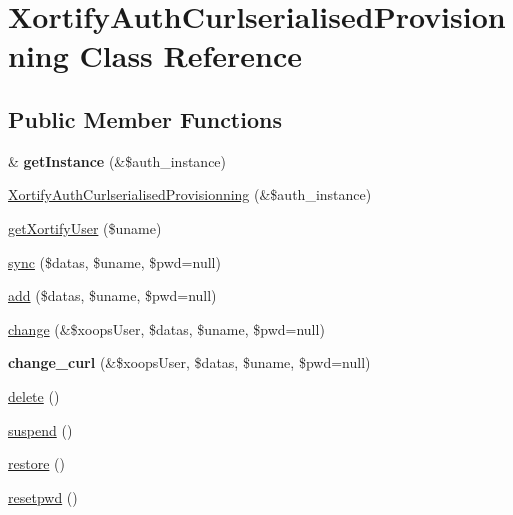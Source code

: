 \hypertarget{class_xortify_auth_curlserialised_provisionning}{\section{Xortify\-Auth\-Curlserialised\-Provisionning Class Reference}
\label{class_xortify_auth_curlserialised_provisionning}
}
\subsection*{Public Member Functions}
\begin{DoxyCompactItemize}
\item 
\hypertarget{class_xortify_auth_curlserialised_provisionning_a2c8eaa915c70d75289ac8a03686194f9}{\& {\bfseries get\-Instance} (\&\$auth\-\_\-instance)}\label{class_xortify_auth_curlserialised_provisionning_a2c8eaa915c70d75289ac8a03686194f9}

\item 
\hyperlink{class_xortify_auth_curlserialised_provisionning_aaae1c1a1306d79a38af6f3e08f39b626}{Xortify\-Auth\-Curlserialised\-Provisionning} (\&\$auth\-\_\-instance)
\item 
\hyperlink{class_xortify_auth_curlserialised_provisionning_a041d726ac26672547ed1504e8e0117aa}{get\-Xortify\-User} (\$uname)
\item 
\hyperlink{class_xortify_auth_curlserialised_provisionning_a35dc08b0f2138eb818ff95345b73bcff}{sync} (\$datas, \$uname, \$pwd=null)
\item 
\hyperlink{class_xortify_auth_curlserialised_provisionning_adfc9fcef01e7bd7b2f47e8e79d51fc63}{add} (\$datas, \$uname, \$pwd=null)
\item 
\hyperlink{class_xortify_auth_curlserialised_provisionning_ae1f0971b9712c794620cf309164e43af}{change} (\&\$xoops\-User, \$datas, \$uname, \$pwd=null)
\item 
\hypertarget{class_xortify_auth_curlserialised_provisionning_aba6f598c234d191a3b3934f90b35fd9f}{{\bfseries change\-\_\-curl} (\&\$xoops\-User, \$datas, \$uname, \$pwd=null)}\label{class_xortify_auth_curlserialised_provisionning_aba6f598c234d191a3b3934f90b35fd9f}

\item 
\hyperlink{class_xortify_auth_curlserialised_provisionning_a13bdffdd926f26b825ea57066334ff01}{delete} ()
\item 
\hyperlink{class_xortify_auth_curlserialised_provisionning_ad73006a505121228f3b075c2409787d2}{suspend} ()
\item 
\hyperlink{class_xortify_auth_curlserialised_provisionning_aa1371f22826cf8cde4454c9b467203d0}{restore} ()
\item 
\hyperlink{class_xortify_auth_curlserialised_provisionning_a06d70fbd3a2db390b6f2530c0076628e}{resetpwd} ()
\end{DoxyCompactItemize}
